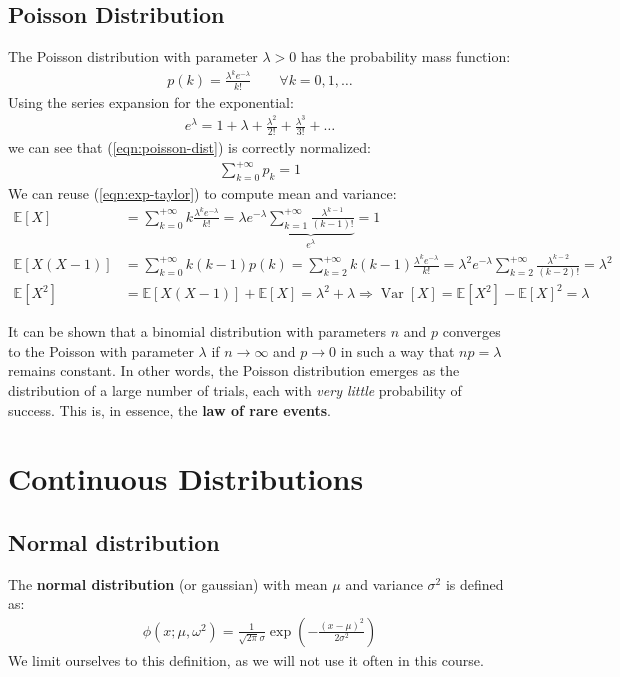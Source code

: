 \documentclass[../template.tex]{subfiles}
\begin{document}
\subsection{Poisson Distribution}
The Poisson distribution with parameter $\lambda > 0$ has the probability mass function:
\begin{align}\label{eqn:poisson-dist}
    p(k) = \frac{\lambda^k e^{-\lambda}}{k!} \qquad \forall k = 0, 1, \dots 
\end{align}
Using the series expansion for the exponential:
\begin{align}\label{eqn:exp-taylor}
    e^{\lambda} = 1 + \lambda + \frac{\lambda^2}{2!} + \frac{\lambda^3}{3!} + \dots  
\end{align}
we can see that (\ref{eqn:poisson-dist}) is correctly normalized:
\begin{align*}
    \sum_{k=0}^{+\infty} p_k = 1
\end{align*}
We can reuse (\ref{eqn:exp-taylor}) to compute mean and variance:
\begin{align*}
    \mathbb{E}[X] &= \sum_{k=0}^{+\infty} k \frac{\lambda^k e^{-\lambda}}{k!} = \lambda e^{-\lambda} \underbrace{\sum_{k=1}^{+\infty} \frac{\lambda^{k-1}}{(k-1)!}}_{e^{\lambda}}  =  1\\
    \mathbb{E}[X(X-1)] &= \sum_{k=0}^{+\infty} k(k-1) p(k) = \sum_{k=2}^{+\infty} k(k-1) \frac{\lambda^k e^{-\lambda}}{k!} = \lambda^2 e^{-\lambda} \sum_{k=2}^{+\infty} \frac{\lambda^{k-2}}{(k-2)!} = \lambda^2  \\
    \mathbb{E}[X^2] &= \mathbb{E}[X(X-1)] + \mathbb{E}[X] = \lambda^2 + \lambda \Rightarrow \operatorname{Var}[X] = \mathbb{E}[X^2] - \mathbb{E}[X]^2 = \lambda 
\end{align*}

It can be shown that a binomial distribution with parameters $n$ and $p$ converges to the Poisson with parameter $\lambda$ if $n \to \infty$ and $p \to 0$ in such a way that $np = \lambda$ remains constant. In other words, the Poisson distribution emerges as the distribution of a large number of trials, each with \textit{very little} probability of success. This is, in essence, the \textbf{law of rare events}.  

\section{Continuous Distributions}

\subsection{Normal distribution}
The \textbf{normal distribution} (or gaussian) with mean $\mu$ and variance $\sigma^2$ is defined as:
\begin{align*}
    \phi(x; \mu, \omega^2) = \frac{1}{\sqrt{2 \pi} \sigma} \exp\left(-\frac{(x-\mu)^2}{2 \sigma^2} \right) 
\end{align*} 
We limit ourselves to this definition, as we will not use it often in this course.
\end{document}
